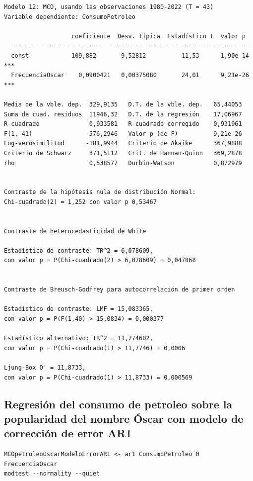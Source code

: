 \documentclass[10pt]{article}
\begin{document}
\begin{verbatim}
Modelo 12: MCO, usando las observaciones 1980-2022 (T = 43)
Variable dependiente: ConsumoPetroleo

                   coeficiente  Desv. típica  Estadístico t  valor p 
  -------------------------------------------------------------------
  const            109,882       9,52812          11,53      1,90e-14 ***
  FrecuenciaOscar    0,0900421   0,00375080       24,01      9,21e-26 ***

Media de la vble. dep.  329,9135   D.T. de la vble. dep.   65,44053
Suma de cuad. residuos  11946,32   D.T. de la regresión    17,06967
R-cuadrado              0,933581   R-cuadrado corregido    0,931961
F(1, 41)                576,2946   Valor p (de F)          9,21e-26
Log-verosimilitud      -181,9944   Criterio de Akaike      367,9888
Criterio de Schwarz     371,5112   Crit. de Hannan-Quinn   369,2878
rho                     0,538577   Durbin-Watson           0,872979


Contraste de la hipótesis nula de distribución Normal:
Chi-cuadrado(2) = 1,252 con valor p 0,53467


Contraste de heterocedasticidad de White

Estadístico de contraste: TR^2 = 6,078609,
con valor p = P(Chi-cuadrado(2) > 6,078609) = 0,047868


Contraste de Breusch-Godfrey para autocorrelación de primer orden

Estadístico de contraste: LMF = 15,083365,
con valor p = P(F(1,40) > 15,0834) = 0,000377

Estadístico alternativo: TR^2 = 11,774602,
con valor p = P(Chi-cuadrado(1) > 11,7746) = 0,0006

Ljung-Box Q' = 11,8733,
con valor p = P(Chi-cuadrado(1) > 11,8733) = 0,000569
\end{verbatim}
\subsection*{Regresión del consumo de petroleo sobre la popularidad del nombre Óscar con modelo de corrección de error AR1}
\label{sec:org5ab1e9b}

\begin{verbatim}
MCOpetroleoOscarModeloErrorAR1 <- ar1 ConsumoPetroleo 0 FrecuenciaOscar
modtest --normality --quiet
\end{verbatim}
\end{document}
